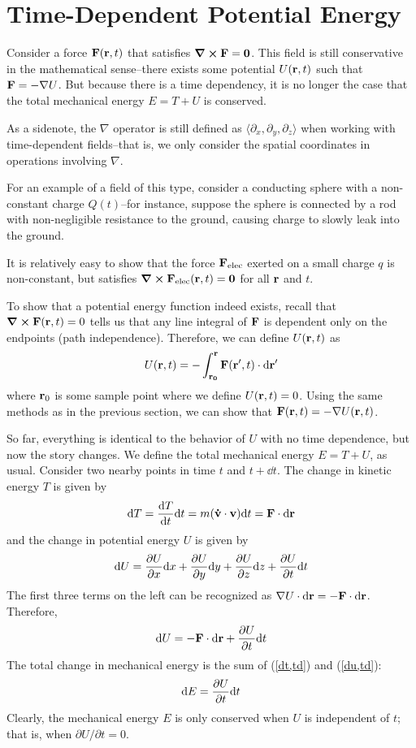 \section{Time-Dependent Potential Energy}
Consider a force $\mathbf{F}(\mathbf{r}, t)$ that satisfies $\curl\mathbf{F} = \mathbf{0}$. This field is still conservative in the mathematical sense--there exists some potential $U(\mathbf{r},t)$ such that $\mathbf{F} = -\nabla U$. But because there is a time dependency, it is no longer the case that the total mechanical energy $E = T + U$ is conserved.

As a sidenote, the $\nabla$ operator is still defined as $\langle \partial_x, \partial_y, \partial_z \rangle$ when working with time-dependent fields--that is, we only consider the spatial coordinates in operations involving $\nabla$.

For an example of a field of this type, consider a conducting sphere with a non-constant charge $Q(t)$--for instance, suppose the sphere is connected by a rod with non-negligible resistance to the ground, causing charge to slowly leak into the ground.

It is relatively easy to show that the force $\mathbf{F}_\text{elec}$ exerted on a small charge $q$ is non-constant, but satisfies $\curl \mathbf{F}_\text{elec}(\mathbf{r}, t) = \mathbf{0}$ for all $\mathbf{r}$ and $t$. 

To show that a potential energy function indeed exists, recall that $\curl\mathbf{F}(\mathbf{r}, t) = 0$ tells us that any line integral of $\mathbf{F}$ is dependent only on the endpoints (path independence). Therefore, we can define $U(\mathbf{r}, t)$ as
\[ U(\mathbf{r},t) = -\int_{\mathbf{r_0}}^{\mathbf{r}} \mathbf{F}(\mathbf{r}', t)\cdot \dd \mathbf{r}' \]
where $\mathbf{r}_0$ is some sample point where we define $U(\mathbf{r}, t) =0$. Using the same methods as in the previous section, we can show that $\mathbf{F}(\mathbf{r}, t) = -\nabla U(\mathbf{r}, t)$.

So far, everything is identical to the behavior of $U$ with no time dependence, but now the story changes. We define the total mechanical energy $E = T + U$, as usual. Consider two nearby points in time $t$ and $t + \dd t$. The change in kinetic energy $T$ is given by
\begin{align} \label{dt,td}
    \dd T = \dv{T}{t}\dd t = m(\mathbf{\dot v} \cdot \mathbf{v})\dd t = \mathbf{F}\cdot \dd \mathbf{r} 
\end{align}
and the change in potential energy $U$ is given by
\[ \dd U = \pdv{U}{x}\dd x + \pdv{U}{y}\dd y + \pdv{U}{z}\dd z + \pdv{U}{t}\dd t \]
The first three terms on the left can be recognized as $\nabla U \cdot \dd \mathbf{r} = -\mathbf{F}\cdot\dd\mathbf{r}$. Therefore,
\begin{equation} \label{du,td}
    \dd U = -\mathbf{F}\cdot\dd\mathbf{r} + \pdv{U}{t}\dd t
\end{equation}
The total change in mechanical energy is the sum of (\ref{dt,td}) and (\ref{du,td}):
\[ \dd E = \pdv{U}{t}\dd t\]
Clearly, the mechanical energy $E$ is only conserved when $U$ is independent of $t$; that is, when $\partial U/\partial t = 0$. 

